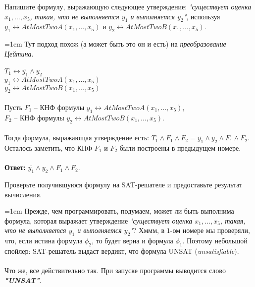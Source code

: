 \documentclass[12pt]{extreport}
\theoremstyle{definiton}
\theoremstyle{definition}
\theoremstyle{definition}
\newcommand{\solution}[2][\color{myblue}Решение]{
\medskip
	\noindent{\bfseries #1 }{{\color{myblue}\bfseries #2:}}
}
\newenvironment{blockquote}{%
  \par%
  \medskip
  \leftskip=1em%
  \noindent}{%
  \par\medskip}
\begin{document}
\Pr[5 баллов] Напишите формулу, выражающую следующее утверждение: \textit{"существует оценка $x_1, \dots, x_5$, такая, что не выполняется $y_1$ и выполняется $y_2$"}, используя $y_1 \leftrightarrow AtMostTwoA(x_1, \dots, x_5)$ и $y_2 \leftrightarrow AtMostTwoB(x_1, \dots, x_5)$.

    \solution{3}
    \begin{blockquote}
    {\color{myblue}
    \noindent Тут подход похож (а может быть это он и есть) на \textit{преобразование Цейтина}.\\
    \\
    $T_1 \leftrightarrow \overline{y_1} \wedge y_2$\\
    $y_1 \leftrightarrow AtMostTwoA(x_1, \dots, x_5)$\\
    $y_2 \leftrightarrow AtMostTwoB(x_1, \dots, x_5)$\\
    \\
    Пусть $F_1$ -- КНФ формулы $y_1 \leftrightarrow AtMostTwoA(x_1, \dots, x_5)$,\\
    $F_2$ -- КНФ формулы $y_2 \leftrightarrow AtMostTwoB(x_1, \dots, x_5)$.\\
    \\
    Тогда формула, выражающая утверждение есть:
    $T_1 \wedge F_1 \wedge F_2 = \overline{y_1} \wedge y_2 \wedge F_1 \wedge F_2$.\\
    Осталось заметить, что КНФ $F_1$ и $F_2$ были построены в предыдущем номере.\\
    \\
    \textbf{Ответ:} $\overline{y_1} \wedge y_2 \wedge F_1 \wedge F_2$.
    }
    \end{blockquote}

\Pr[5 баллов] Проверьте получившуюся формулу на SAT-решателе и предоставьте результат вычисления.

    \solution{4}
    \begin{blockquote}
    {\color{myblue}
    \noindent Прежде, чем программировать, подумаем, может ли быть выполнима формула, которая выражает утверждение \textit{"существует оценка $x_1, \dots, x_5$, такая, что не выполняется $y_1$ и выполняется $y_2$"}? Хммм, в $1$-ом номере мы проверяли, что, если истина формула $\phi_2$, то будет верна и формула $\phi_1$. Поэтому небольшой спойлер: SAT-решатель выдаст вердикт, что формула UNSAT (\textit{unsatisfiable}).\\
    \\
    Что же, все действительно так. При запуске программы {} выводится слово \textbf{\textit{"UNSAT"}}.
    }
    \end{blockquote}
\end{document}
